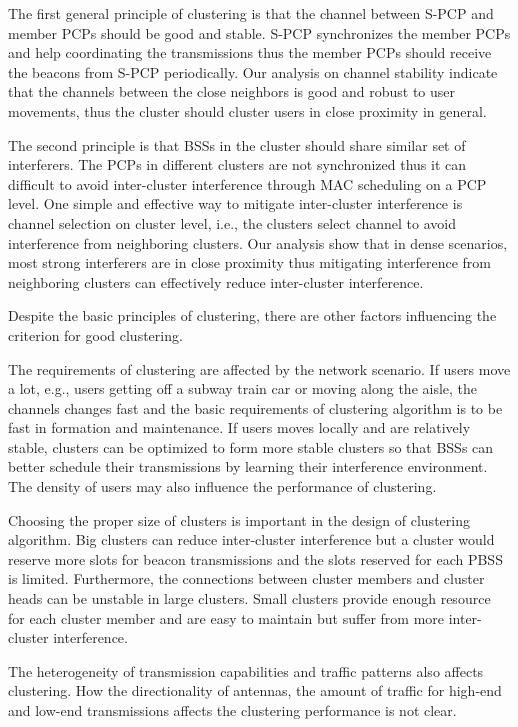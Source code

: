 \documentclass[10pt, conference, letterpaper]{IEEEtran}
\begin{document}
The first general principle of clustering is that the channel between S-PCP and member PCPs should be good and stable. S-PCP synchronizes the member PCPs and help coordinating the transmissions thus the member PCPs should receive the beacons from S-PCP periodically. Our analysis on channel stability indicate that the channels between the close neighbors is good and robust to user movements, thus the cluster should cluster users in close proximity in general. 

The second principle is that BSSs in the cluster should share similar set of interferers. The PCPs in different clusters are not synchronized thus it can difficult to avoid inter-cluster interference through MAC scheduling on a PCP level. One simple and effective way to mitigate inter-cluster interference is channel selection on cluster level, i.e., the clusters select channel to avoid interference from neighboring clusters. Our analysis show that in dense scenarios, most strong interferers are in close proximity thus mitigating interference from neighboring clusters can effectively reduce inter-cluster interference. 

Despite the basic principles of clustering, there are other factors influencing the criterion for good clustering.

The requirements of clustering are affected by the network scenario. If users move a lot, e.g., users getting off a subway train car or moving along the aisle, the channels changes fast and the basic requirements of clustering algorithm is to be fast in formation and maintenance. If users moves locally and are relatively stable, clusters can be optimized to form more stable clusters so that BSSs can better schedule their transmissions by learning their interference environment. The density of users may also influence the performance of clustering.

Choosing the proper size of clusters is important in the design of clustering algorithm. Big clusters can reduce inter-cluster interference but a cluster would reserve more slots for beacon transmissions and the slots reserved for each PBSS is limited. Furthermore, the connections between cluster members and cluster heads can be unstable in large clusters.
Small clusters provide enough resource for each cluster member and are easy to maintain but suffer from more inter-cluster interference.

The heterogeneity of transmission capabilities and traffic patterns also affects clustering. How the directionality of antennas, the amount of traffic for high-end and low-end transmissions affects the clustering performance is not clear. 
\end{document}
